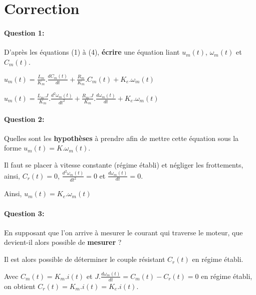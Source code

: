 \newpage

\pagestyle{correction}

\section{Correction}

\paragraph{Question 1:} D'après les équations (1) à (4), \textbf{écrire} une équation liant $u_m(t)$, $\omega_m(t)$ et $C_m(t)$.

$u_m(t)=\frac{L_m}{K_m}.\frac{dC_m(t)}{dt}+\frac{R_m}{K_m}.C_m(t)+K_e.\omega_m(t)$

$u_m(t)=\frac{L_m.J}{K_m}.\frac{d^2\omega_m(t)}{dt^2}+\frac{R_m.J}{K_m}.\frac{d\omega_m(t)}{dt}+K_e.\omega_m(t)$


\paragraph{Question 2:} Quelles sont les \textbf{hypothèses} à prendre afin de mettre cette équation sous la forme $u_m(t)=K.\omega_m(t)$.

Il faut se placer à vitesse constante (régime établi) et négliger les frottements, ainsi, $C_r(t)=0$, $\frac{d^2\omega_m(t)}{dt^2}=0$ et $\frac{d\omega_m(t)}{dt}=0$.

Ainsi, $u_m(t)=K_e.\omega_m(t)$

\paragraph{Question 3:} En supposant que l'on arrive à mesurer le courant qui traverse le moteur, que devient-il alors possible de \textbf{mesurer} ?

Il est alors possible de déterminer le couple résistant $C_r(t)$ en régime établi.

Avec $C_m(t)=K_m.i(t)$ et $J.\frac{d\omega_m(t)}{dt}=C_m(t)-C_r(t)=0$ en régime établi, on obtient $C_r(t)=K_m.i(t)=K_e.i(t)$.


